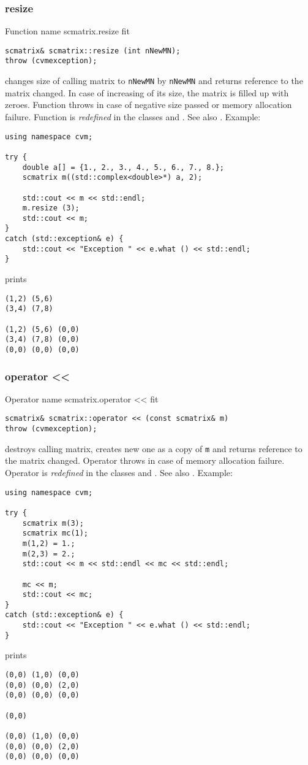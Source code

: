 \subsubsection{resize}
Function%
\pdfdest name {scmatrix.resize} fit
\begin{verbatim}
scmatrix& scmatrix::resize (int nNewMN);
throw (cvmexception);
\end{verbatim}
changes  size of  calling matrix to \verb"nNewMN" by \verb"nNewMN"
and returns  reference to
the matrix changed. In case of increasing of its size, the matrix
is filled up with zeroes.
Function throws  
in case of negative size passed or memory allocation failure.
Function is \emph{redefined} in the classes
and .
See also .
Example:
\begin{Verbatim}
using namespace cvm;

try {
    double a[] = {1., 2., 3., 4., 5., 6., 7., 8.};
    scmatrix m((std::complex<double>*) a, 2);

    std::cout << m << std::endl;
    m.resize (3);
    std::cout << m;
}
catch (std::exception& e) {
    std::cout << "Exception " << e.what () << std::endl;
}
\end{Verbatim}
prints
\begin{Verbatim}
(1,2) (5,6)
(3,4) (7,8)

(1,2) (5,6) (0,0)
(3,4) (7,8) (0,0)
(0,0) (0,0) (0,0)
\end{Verbatim}
\newpage





\subsubsection{operator <{}<}
Operator%
\pdfdest name {scmatrix.operator <<} fit
\begin{verbatim}
scmatrix& scmatrix::operator << (const scmatrix& m)
throw (cvmexception);
\end{verbatim}
destroys  calling matrix, creates  new one as a copy of \verb"m"
and returns  reference to
the matrix changed.
Operator throws  
in case of memory allocation failure.
Operator is \emph{redefined} in the classes
and .
See also .
Example:
\begin{Verbatim}
using namespace cvm;

try {
    scmatrix m(3);
    scmatrix mc(1);
    m(1,2) = 1.;
    m(2,3) = 2.;
    std::cout << m << std::endl << mc << std::endl;

    mc << m;
    std::cout << mc;
}
catch (std::exception& e) {
    std::cout << "Exception " << e.what () << std::endl;
}
\end{Verbatim}
prints
\begin{Verbatim}
(0,0) (1,0) (0,0)
(0,0) (0,0) (2,0)
(0,0) (0,0) (0,0)

(0,0)

(0,0) (1,0) (0,0)
(0,0) (0,0) (2,0)
(0,0) (0,0) (0,0)
\end{Verbatim}
\newpage




